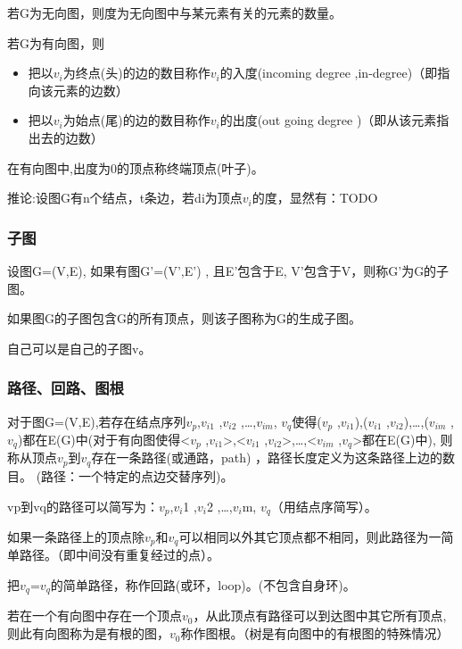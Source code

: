 \documentclass[AutoFakeBold]{LZUThesis2007}
\begin{document}
若G为无向图，则度为无向图中与某元素有关的元素的数量。

若G为有向图，则
\begin{itemize}
	\item 把以$v_{i}$为终点(头)的边的数目称作$v_{i}$的入度(incoming degree ,in-degree)（即指向该元素的边数）
	\item 把以$v_{i}$为始点(尾)的边的数目称作$v_{i}$的出度(out going degree )（即从该元素指出去的边数）
\end{itemize}

在有向图中,出度为0的顶点称终端顶点(叶子)。

推论:设图G有n个结点，t条边，若di为顶点$v_{i}$的度，显然有：TODO



			\subsubsection{子图}
设图G=(V,E), 如果有图G'=(V',E') , 且E'包含于E, V'包含于V，则称G'为G的子图。

如果图G的子图包含G的所有顶点，则该子图称为G的生成子图。

自己可以是自己的子图v。

			\subsubsection{路径、回路、图根}
对于图G=(V,E),若存在结点序列$v_{p}$,$v_{i1}$ ,$v_{i2}$ ,…,$v_{im}$, $v_{q}$使得($v_{p}$ ,$v_{i1}$),($v_{i1}$ ,$v_{i2}$),…,($v_{im}$ ,$v_{q}$)都在E(G)中(对于有向图使得<$v_{p}$ ,$v_{i1}$>,<$v_{i1}$ ,$v_{i2}$>,…,<$v_{im}$ ,$v_{q}$>都在E(G)中), 则称从顶点$v_{p}$到$v_{q}$存在一条路径(或通路，path) ，路径长度定义为这条路径上边的数目。 (路径：一个特定的点边交替序列)。

vp到vq的路径可以简写为：$v_{p}$,$v_{i}$1 ,$v_{i}$2 ,…,$v_{i}$m, $v_{q}$（用结点序简写）。

如果一条路径上的顶点除$v_{p}$和$v_{q}$可以相同以外其它顶点都不相同，则此路径为一简单路径。（即中间没有重复经过的点）。

把$v_{q}$=$v_{q}$的简单路径，称作回路(或环，loop)。(不包含自身环)。

若在一个有向图中存在一个顶点$v_{0}$，从此顶点有路径可以到达图中其它所有顶点,则此有向图称为是有根的图，$v_{0}$称作图根。（树是有向图中的有根图的特殊情况）
\end{document}
